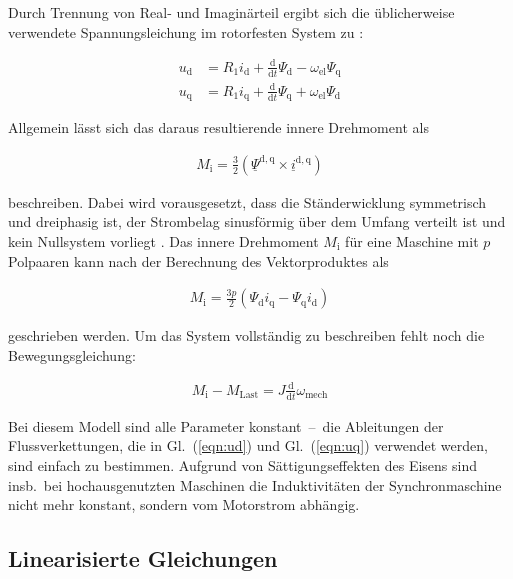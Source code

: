 \documentclass[conference,twocolumn]{IEEEtran}
\newcommand{\shortpage}{\enlargethispage{-\baselineskip}}
\newcommand{\x}[1]{\mathrm{#1}}
\begin{document}
\shortpage

Durch Trennung von Real- und Imaginärteil ergibt sich die üblicherweise verwendete Spannungsleichung im rotorfesten System zu \autocites{schroder2001}{nuss2010}:

\begin{align}
u_\x{d} &= R_\x{1} i_\x{d} + \frac{\x{d}}{\x{d}t}\Psi_\x{d} - \omega_{\x{el}} \Psi_\x{q} \label{eqn:ud} \\ 
u_\x{q} &= R_\x{1} i_\x{q} + \frac{\x{d}}{\x{d}t}\Psi_\x{q} + \omega_{\x{el}} \Psi_\x{d} \label{eqn:uq}
\end{align}

Allgemein lässt sich das daraus resultierende innere Drehmoment als

\begin{align}
M_\x{i} = \frac{3}{2} (\underline{\Psi}^{\x{d,q}} \times \underline{i}^{\x{d,q}}) \label{drehmoment}
\end{align}

beschreiben.
Dabei wird vorausgesetzt, dass die Ständerwicklung symmetrisch und dreiphasig ist, der Strombelag sinusförmig über dem Umfang verteilt ist und kein Nullsystem vorliegt \autocite{schroder2001}.
Das innere Drehmoment $M_\x{i}$ für eine Maschine mit $p$ Polpaaren kann nach der Berechnung des Vektorproduktes als

\begin{align}
M_\x{i} = \frac{3p}{2}(\Psi_\x{d} i_\x{q} - \Psi_\x{q} i_\x{d})
\end{align}

geschrieben werden.
Um das System vollständig zu beschreiben fehlt noch die Bewegungsgleichung:

\begin{align}
M_\x{i} - M_\x{Last} = J \frac{\x{d}}{\x{d}t} \omega_{\x{mech}} \label{bewegungsgleichung}
\end{align}

Bei diesem Modell sind alle Parameter konstant~--~die Ableitungen der Flussverkettungen, die in Gl.~(\ref{eqn:ud}) und Gl.~(\ref{eqn:uq}) verwendet werden, sind einfach zu bestimmen.
Aufgrund von Sättigungseffekten des Eisens sind insb.\ bei hochausgenutzten Maschinen die Induktivitäten der Synchronmaschine nicht mehr konstant, sondern vom Motorstrom abhängig.

\subsection{Linearisierte Gleichungen}\label{sec:lin-gleichungen}
\end{document}
